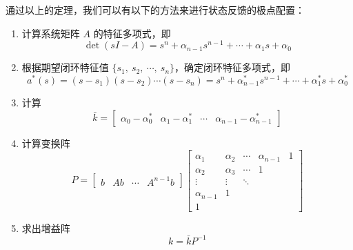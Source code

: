 通过以上的定理，我们可以有以下的方法来进行状态反馈的极点配置：
\begin{anymark}[基于第二能控规范型的状态反馈极点配置]
    \begin{enumerate}[label=\textbf{第 \arabic* 步.}, leftmargin=*]
        \item 计算系统矩阵 $A$ 的特征多项式，即
        \[
        \det(sI-A)
        =s^n+\alpha_{n-1}s^{n-1}+\cdots+\alpha_1s+\alpha_0
        \]

        \item 根据期望闭环特征值
        $\{s_1,\ s_2,\ \cdots,\ s_n\}$，确定闭环特征多项式，即
        \[
        a^*(s)
        =(s-s_1)(s-s_2)\cdots(s-s_n)
        =s^n+\alpha_{n-1}^*s^{n-1}+\cdots+\alpha_1^*s+\alpha_0^*
        \]

        \item 计算
        \[
        \bar{k}
        =
        \begin{bmatrix}
        \alpha_0-\alpha_0^*
        &
        \alpha_1-\alpha_1^*
        &
        \cdots
        &
        \alpha_{n-1}-\alpha_{n-1}^*
        \end{bmatrix}
        \]

        \item 计算变换阵
        \[
        P
        =
        \begin{bmatrix}
        b & Ab & \cdots & A^{n-1}b
        \end{bmatrix}
        \begin{bmatrix}
        \alpha_1 & \alpha_2 & \cdots & \alpha_{n-1} & 1 \\
        \alpha_2 & \alpha_3 & \cdots & 1 &  \\
        \vdots & \vdots & \ddots &  &  \\
        \alpha_{n-1} & 1 &  &  &  \\
        1 &  &  &  &
        \end{bmatrix}
        \]

        \item 求出增益阵
        \[
        k=\bar{k}P^{-1}
        \]
    \end{enumerate}
\end{anymark}

